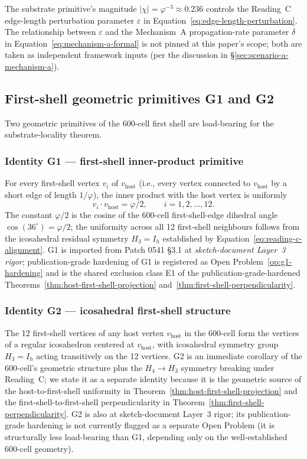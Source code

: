 \documentclass[11pt,letterpaper]{article}
\newcommand{\phig}{\varphi}
\newcommand{\vhost}{v_{\text{host}}}
\begin{document}
The substrate primitive's magnitude $|\chi| = \phig^{-3} \approx 0.236$ controls the Reading~C edge-length perturbation parameter $\varepsilon$ in Equation~\eqref{eq:edge-length-perturbation}. The relationship between $\varepsilon$ and the Mechanism~A propagation-rate parameter $\delta$ in Equation~\eqref{eq:mechanism-a-formal} is not pinned at this paper's scope; both are taken as independent framework inputs (per the discussion in \S\ref{sec:scenario-a-mechanism-a}).

\subsection{First-shell geometric primitives G1 and G2}
\label{sec:first-shell-primitives}

Two geometric primitives of the 600-cell first shell are load-bearing for the substrate-locality theorem.

\subsubsection*{Identity G1 --- first-shell inner-product primitive}

For every first-shell vertex $v_i$ of $\vhost$ (i.e., every vertex connected to $\vhost$ by a short edge of length $1/\phig$), the inner product with the host vertex is uniformly
\begin{equation}
v_i \cdot \vhost = \phig / 2, \qquad i = 1, 2, \ldots, 12.
\label{eq:g1-primitive}
\end{equation}
The constant $\phig/2$ is the cosine of the 600-cell first-shell-edge dihedral angle $\cos(36^{\circ}) = \phig/2$; the uniformity across all 12 first-shell neighbours follows from the icosahedral residual symmetry $H_3 = I_h$ established by Equation~\eqref{eq:reading-c-alignment}. G1 is imported from Patch 0541 \S3.1 at \emph{sketch-document Layer~3 rigor}; publication-grade hardening of G1 is registered as Open Problem~\ref{op:g1-hardening} and is the shared exclusion class E1 of the publication-grade-hardened Theorems~\ref{thm:host-first-shell-projection} and~\ref{thm:first-shell-perpendicularity}.

\subsubsection*{Identity G2 --- icosahedral first-shell structure}

The 12 first-shell vertices of any host vertex $\vhost$ in the 600-cell form the vertices of a regular icosahedron centered at $\vhost$, with icosahedral symmetry group $H_3 = I_h$ acting transitively on the 12 vertices. G2 is an immediate corollary of the 600-cell's geometric structure plus the $H_4 \to H_3$ symmetry breaking under Reading~C; we state it as a separate identity because it is the geometric source of the host-to-first-shell uniformity in Theorem~\ref{thm:host-first-shell-projection} and the first-shell-to-first-shell perpendicularity in Theorem~\ref{thm:first-shell-perpendicularity}. G2 is also at sketch-document Layer~3 rigor; its publication-grade hardening is not currently flagged as a separate Open Problem (it is structurally less load-bearing than G1, depending only on the well-established 600-cell geometry).
\end{document}
